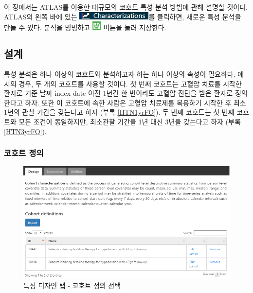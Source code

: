\documentclass[10.5pt]{book}
\theoremstyle{definition}
\theoremstyle{definition}
\theoremstyle{definition}
\theoremstyle{remark}
\begin{document}
이 장에서는 ATLAS를 이용한 대규모의 코호트 특성 분석 방법에 관해 설명할
것이다. ATLAS의 왼쪽 바에 있는
\includegraphics{images/Characterization/atlasCharacterizationMenuItem.png}를
클릭하면, 새로운 특성 분석을 만들 수 있다. 분석을 명명하고
\includegraphics{images/PopulationLevelEstimation/save.png} 버튼을 눌러
저장한다.

\subsection{설계}

특성 분석은 하나 이상의 코호트와 분석하고자 하는 하나 이상의 속성이
필요하다. 예시의 경우, 두 개의 코호트를 사용할 것이다. 첫 번째 코호트는
고혈압 치료를 시작한 환자로 기준 날짜 index date 이전 1년간 한 번이라도
고혈압 진단을 받은 환자로 정의한다고 하자. 또한 이 코호트에 속한 사람은
고혈압 치료제를 복용하기 시작한 후 최소 1년의 관찰 기간을 갖는다고 하자
(부록 \ref{HTN1yrFO}). 두 번째 코호트는 첫 번째 코호트와 모든 조건이
동일하지만, 최소관찰 기간을 1년 대신 3년을 갖는다고 하자 (부록
\ref{HTN3yrFO}).

\subsubsection*{코호트 정의}\label{-}

\begin{figure}

{\centering \includegraphics[width=1\linewidth]{images/Characterization/atlasCharacterizationCohortSelection} 

}

\caption{특성 디자인 탭 - 코호트 정의 선택}\label{fig:atlasCharacterizationCohortSelection}
\end{figure}
\end{document}
